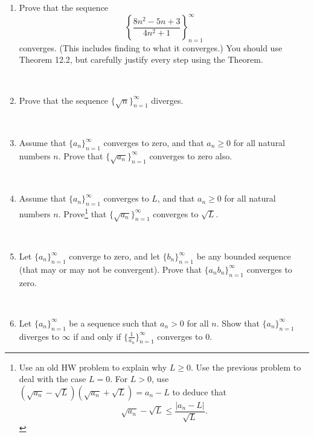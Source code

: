 \documentclass{amsart}
\begin{document}
\begin{enumerate}

\item Prove that the sequence \[ \left\{ \frac{ 8 n^2 - 5n +3} {4 n^2 + 1} \right\}_{n=1}^\infty\]
converges. (This includes finding to what it converges.) You should use Theorem 12.2, but carefully justify every step using the Theorem.

\

\item Prove that the sequence $\{\sqrt{n}\}_{n=1}^\infty$ diverges.

\

\item Assume that $\{a_n\}_{n=1}^\infty$ converges to zero, and that $a_n\geq 0$ for all natural numbers $n$. Prove that $\{ \sqrt{a_n}\}_{n=1}^\infty$ converges to zero also.

\

\item Assume that $\{a_n\}_{n=1}^\infty$ converges to $L$, and that $a_n\geq 0$ for all natural numbers $n$. Prove\footnote{Use an old HW problem to explain why $L\geq 0$. Use the previous problem to deal with the case $L=0$. For $L>0$, use $(\sqrt{a_n}-\sqrt{L})(\sqrt{a_n}+\sqrt{L})=a_n-L$ to deduce that \[\sqrt{a_n}-\sqrt{L} \leq \frac{ |a_n - L|}{\sqrt{L}}.\]} that $\{ \sqrt{a_n}\}_{n=1}^\infty$ converges to $\sqrt{L}$.

\


\item Let $\{a_n\}_{n=1}^\infty$ converge to zero, and let $\{b_n\}_{n=1}^\infty$ be any bounded sequence (that may or may not be convergent). Prove that $\{a_n b_n\}_{n=1}^\infty$ converges to zero.

\

\item Let $\{a_n\}_{n=1}^\infty$ be a sequence such that $a_n>0$ for all $n$. Show that $\{a_n\}_{n=1}^\infty$ diverges to $\infty$ if and only if $\{\frac{1}{a_n}\}_{n=1}^\infty$ converges to $0$.





\end{enumerate}
\end{document}
